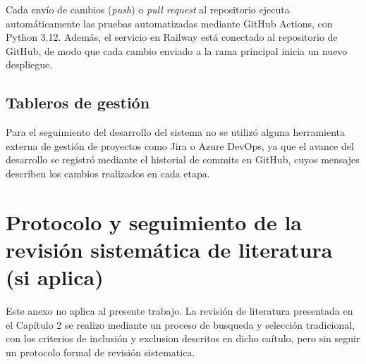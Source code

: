 Cada envío de cambios (\textit{push}) o \textit{pull request} al repositorio ejecuta automáticamente las pruebas automatizadas mediante GitHub Actions, con Python 3.12. Además, el servicio en Railway está conectado al repositorio de GitHub, de modo que cada cambio enviado a la rama principal inicia un nuevo despliegue.

\subsection*{Tableros de gestión}


Para el seguimiento del desarrollo del sistema no se utilizó alguna herramienta externa de gestión de proyectos como Jira o Azure DevOps, ya que el avance del desarrollo se registró mediante el historial de commits en GitHub, cuyos mensajes describen los cambios realizados en cada etapa.



\section{Protocolo y seguimiento de la revisión sistemática de literatura (si aplica)}
Este anexo no aplica al presente trabajo. La revisión de literatura presentada en el Capítulo 2 se realizo mediante un proceso de busqueda y selección tradicional, con los criterios de inclusión y exclusion descritos en dicho caítulo, pero sin seguir un protocolo formal de revisión sistematica.